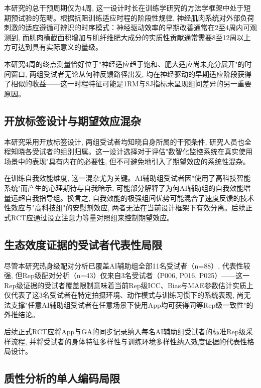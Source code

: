 本研究的总干预周期仅为4周, 这一设计时长在训练学研究的方法学框架中处于短期预试验的范畴。根据抗阻训练适应时程的阶段性规律, 神经肌肉系统对外部负荷刺激的适应遵循可辨识的时序模式：神经驱动效率的早期改善通常在2至4周内可观测到, 而肌肉横截面积增加与肌纤维肥大成分的实质性贡献通常需要8至12周以上方可达到具有实际意义的量级。

本研究4周的终点测量恰好位于"神经适应趋于饱和、肥大适应尚未充分展开"的时间窗口, 两组受试者无论从何种反馈路径出发, 均在神经驱动的早期适应阶段获得了相似的收益——这一时程特征可能是1RM与SJ指标未呈现组间差异的另一重要原因。

\subsection{开放标签设计与期望效应混杂}
\label{sec:blinding}

本研究采用开放标签设计, 两组受试者均知晓自身所属的干预条件, 研究人员也全程知晓各受试者的组别归属。这一设计选择对于评估"数智化监控系统在真实使用场景中的表现"具有内在的必要性, 但不可避免地引入了期望效应的系统性混杂。

在训练自我效能维度, 这一混杂尤为关键。AI辅助组受试者因"使用了高科技智能系统"而产生的心理期待与自我暗示, 可能部分解释了为何AI辅助组的自我效能增量远超自我指导组。换言之, 自我效能的极强组间优势可能混合了速度反馈的技术性效应与"高科技组"的安慰剂效应, 两者无法在当前设计框架下有效分离。后续正式RCT应通过设立注意力等量对照组来控制期望效应。

\subsection{生态效度证据的受试者代表性局限}
\label{sec:ecological_lim}

尽管本研究热身级配对分析已覆盖AI辅助组全部11名受试者（n=88）, 代表性较强, 但Rep级配对分析（n=43）仅来自3名受试者（P006, P016, P025）——这一Rep级证据的受试者覆盖限制意味着当前Rep级ICC、Bias与MAE参数估计实质上仅代表了这3名受试者在特定拍摄环境、动作模式与训练习惯下的系统表现, 尚无法支撑"任意AI辅助组受试者在任意场景下使用App均可获得同等Rep级一致性"的外推结论。

后续正式RCT应将App与GA的同步记录纳入每名AI辅助组受试者的标准Rep级采样流程, 并将受试者的身体特征多样性与训练环境多样性纳入效度证据的代表性格局设计。

\subsection{质性分析的单人编码局限}
\label{sec:qualitative_lim}

